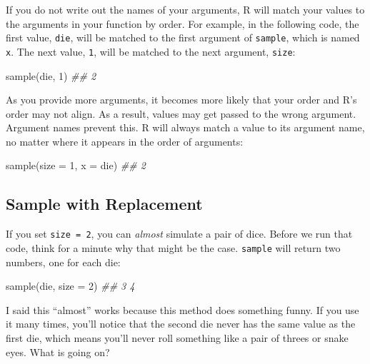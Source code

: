 \documentclass[
  letterpaper,
  DIV=11,
  numbers=noendperiod]{scrbook}
\newenvironment{Shaded}{\begin{snugshade}}{\end{snugshade}}
\newcommand{\AttributeTok}[1]{\textcolor[rgb]{0.40,0.45,0.13}{#1}}
\newcommand{\DecValTok}[1]{\textcolor[rgb]{0.68,0.00,0.00}{#1}}
\newcommand{\DocumentationTok}[1]{\textcolor[rgb]{0.37,0.37,0.37}{\textit{#1}}}
\newcommand{\FunctionTok}[1]{\textcolor[rgb]{0.28,0.35,0.67}{#1}}
\newcommand{\NormalTok}[1]{\textcolor[rgb]{0.00,0.23,0.31}{#1}}
\begin{document}
If you do not write out the names of your arguments, R will match your
values to the arguments in your function by order. For example, in the
following code, the first value, \texttt{die}, will be matched to the
first argument of \texttt{sample}, which is named \texttt{x}. The next
value, \texttt{1}, will be matched to the next argument, \texttt{size}:

\begin{Shaded}
\begin{Highlighting}[]
\FunctionTok{sample}\NormalTok{(die, }\DecValTok{1}\NormalTok{)}
\DocumentationTok{\#\# 2}
\end{Highlighting}
\end{Shaded}

As you provide more arguments, it becomes more likely that your order
and R's order may not align. As a result, values may get passed to the
wrong argument. Argument names prevent this. R will always match a value
to its argument name, no matter where it appears in the order of
arguments:

\begin{Shaded}
\begin{Highlighting}[]
\FunctionTok{sample}\NormalTok{(}\AttributeTok{size =} \DecValTok{1}\NormalTok{, }\AttributeTok{x =}\NormalTok{ die)}
\DocumentationTok{\#\# 2}
\end{Highlighting}
\end{Shaded}

\subsection{Sample with Replacement}\label{sample-with-replacement}

If you set \texttt{size\ =\ 2}, you can \emph{almost} simulate a pair of
dice. Before we run that code, think for a minute why that might be the
case. \texttt{sample} will return two numbers, one for each die:

\begin{Shaded}
\begin{Highlighting}[]
\FunctionTok{sample}\NormalTok{(die, }\AttributeTok{size =} \DecValTok{2}\NormalTok{)}
\DocumentationTok{\#\# 3 4}
\end{Highlighting}
\end{Shaded}

I said this ``almost'' works because this method does something funny.
If you use it many times, you'll notice that the second die never has
the same value as the first die, which means you'll never roll something
like a pair of threes or snake eyes. What is going on?
\end{document}
